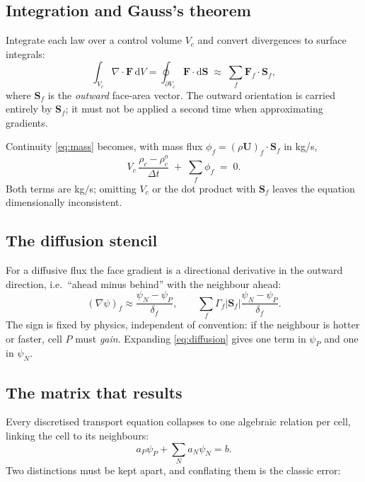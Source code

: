 \documentclass[11pt,a4paper]{article}
\newcommand{\Sf}{\mathbf{S}_f}
\newcommand{\uvec}{\mathbf{U}}
\newcommand{\dt}{\Delta t}
\begin{document}
\subsection{Integration and Gauss's theorem}

Integrate each law over a control volume $V_c$ and convert divergences to
surface integrals:
\begin{equation}
  \int_{V_c} \nabla\!\cdot\!\mathbf{F}\, \mathrm{d}V
  = \oint_{\partial V_c} \mathbf{F}\cdot \mathrm{d}\mathbf{S}
  \;\approx\; \sum_f \mathbf{F}_f \cdot \Sf ,
\end{equation}
where $\Sf$ is the \emph{outward} face-area vector. The outward orientation is
carried entirely by $\Sf$; it must not be applied a second time when
approximating gradients.

Continuity \eqref{eq:mass} becomes, with mass flux $\phi_f = (\rho\uvec)_f\cdot\Sf$
in \si{kg/s},
\begin{equation}
  V_c\,\frac{\rho_c - \rho_c^{o}}{\dt} \;+\; \sum_f \phi_f \;=\; 0 .
  \label{eq:disc-mass}
\end{equation}
Both terms are \si{kg/s}; omitting $V_c$ or the dot product with $\Sf$ leaves
the equation dimensionally inconsistent.

\subsection{The diffusion stencil}

For a diffusive flux the face gradient is a directional derivative in the
outward direction, i.e.\ ``ahead minus behind'' with the neighbour ahead:
\begin{equation}
  (\nabla \psi)_f \approx \frac{\psi_N - \psi_P}{\delta_f},
  \qquad
  \sum_f \Gamma_f |\Sf| \frac{\psi_N - \psi_P}{\delta_f}.
  \label{eq:diffusion}
\end{equation}
The sign is fixed by physics, independent of convention: if the neighbour is
hotter or faster, cell $P$ must \emph{gain}. Expanding \eqref{eq:diffusion}
gives one term in $\psi_P$ and one in $\psi_N$.

\subsection{The matrix that results}

Every discretised transport equation collapses to one algebraic relation per
cell, linking the cell to its neighbours:
\begin{equation}
  a_P \psi_P + \sum_N a_N \psi_N = b .
  \label{eq:row}
\end{equation}
Two distinctions must be kept apart, and conflating them is the classic error:
\end{document}
